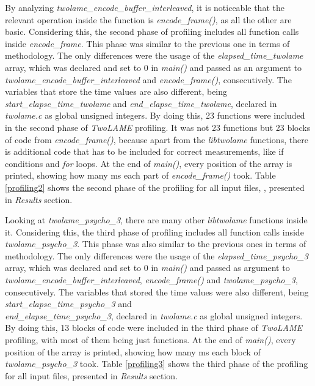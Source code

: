 By analyzing \textit{twolame\_encode\_buffer\_interleaved}, it is noticeable that the relevant operation inside the function is \textit{encode\_frame()}, as all the other are basic.
Considering this, the second phase of profiling includes all function calls inside \textit{encode\_frame}. 
This phase was similar to the previous one in terms of methodology. The only differences were the usage of the \textit{elapsed\_time\_twolame} array, which was declared and set to 0 in \textit{main()} and passed as an argument to \textit{twolame\_encode\_buffer\_interleaved} and \textit{encode\_frame()}, consecutively. The variables that store the time values are also different, being \textit{start\_elapse\_time\_twolame} and \textit{end\_elapse\_time\_twolame}, declared in \textit{twolame.c} as global unsigned integers.
By doing this, 23 functions were included in the second phase of \textit{TwoLAME} profiling. It was not 23 functions but 23 blocks of code from \textit{encode\_frame()}, because apart from the \textit{libtwolame} functions, there is additional code that has to be included for correct measurements, like if conditions and \textit{for} loops.
At the end of \textit{main()}, every position of the array is printed, showing how many ms each part of \textit{encode\_frame()} took. 
Table \ref{profiling2} shows the second phase of the profiling for all input files, , presented in \textit{Results} section.

Looking at \textit{twolame\_psycho\_3}, there are many other \textit{libtwolame} functions inside it. Considering this, the third phase of profiling includes all function calls inside \textit{twolame\_psycho\_3}. 
This phase was also similar to the previous ones in terms of methodology. The only differences were the usage of the \textit{elapsed\_time\_psycho\_3} array, which was declared and set to 0 in \textit{main()} and passed as argument to \textit{twolame\_encode\_buffer\_interleaved}, \textit{encode\_frame()} and \textit{twolame\_psycho\_3}, consecutively. The variables that stored the time values were also different, being \textit{start\_elapse\_time\_psycho\_3} and \\ \textit{end\_elapse\_time\_psycho\_3}, declared in \textit{twolame.c} as global unsigned integers.
By doing this, 13 blocks of code were included in the third phase of \textit{TwoLAME} profiling, with most of them being just functions.
At the end of \textit{main()}, every position of the array is printed, showing how many ms each block of \textit{twolame\_psycho\_3} took. 
Table \ref{profiling3} shows the third phase of the profiling for all input files, presented in \textit{Results} section.


